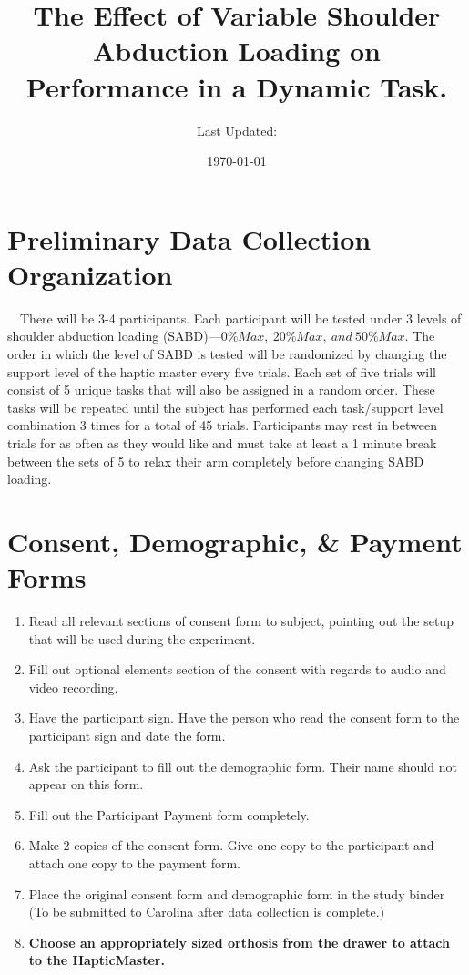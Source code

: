 \documentclass[11pt]{article}
\begin{document}
\title{The Effect of Variable Shoulder Abduction Loading on Performance in a Dynamic Task.}
\author{Last Updated:}
\date{\today}
\maketitle
\section{Preliminary Data Collection Organization}

\	\	There will be 3-4 participants. Each participant will be tested under 3 levels of shoulder abduction loading (SABD)---$0\% Max,\ 20\%Max,\ and\ 50\%Max$. The order in which the level of SABD is tested will be randomized by changing the support level of the haptic master every five trials. Each set of five trials will consist of 5 unique tasks that will also be assigned in a random order. These tasks will be repeated until the subject has performed each task/support level combination 3 times for a total of 45 trials. Participants may rest in between trials for as often as they would like and must take at least a 1 minute break between the sets of 5 to relax their arm completely before changing SABD loading. 
\section{Consent, Demographic, \& Payment Forms}
\begin{enumerate}
\item Read all relevant sections of consent form to subject, pointing out the setup that will be used during the experiment.
\item Fill out optional elements section of the consent with regards to audio and video recording.
\item Have the participant sign. Have the person who read the consent form to the participant sign and date the form.
\item Ask the participant to fill out the demographic form. Their name should not appear on this form.
\item Fill out the Participant Payment form completely.
\item Make 2 copies of the consent form. Give one copy to the participant and attach one copy to the payment form. 
\item Place the original consent form and demographic form in the study binder (To be submitted to Carolina after data collection is complete.)
\item \textbf{Choose an appropriately sized orthosis from the drawer to attach to the HapticMaster.}
\end{enumerate}
\end{document}
